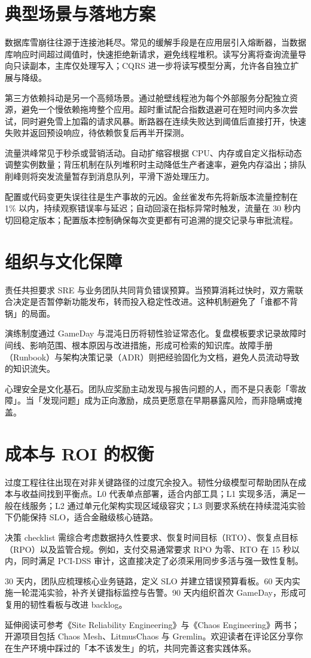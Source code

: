 \chapter{典型场景与落地方案}
数据库雪崩往往源于连接池耗尽。常见的缓解手段是在应用层引入熔断器，当数据库响应时间超过阈值时，快速拒绝新请求，避免线程堆积。读写分离将查询流量导向只读副本，主库仅处理写入；CQRS 进一步将读写模型分离，允许各自独立扩展与降级。\par
第三方依赖抖动是另一个高频场景。通过舱壁线程池为每个外部服务分配独立资源，避免一个慢依赖拖垮整个应用。超时重试配合指数退避可在短时间内多次尝试，同时避免雪上加霜的请求风暴。断路器在连续失败达到阈值后直接打开，快速失败并返回预设响应，待依赖恢复后再半开探测。\par
流量洪峰常见于秒杀或营销活动。自动扩缩容根据 CPU、内存或自定义指标动态调整实例数量；背压机制在队列堆积时主动降低生产者速率，避免内存溢出；排队削峰则将突发流量暂存到消息队列，平滑下游处理压力。\par
配置或代码变更失误往往是生产事故的元凶。金丝雀发布先将新版本流量控制在 1\%{} 以内，持续观察错误率与延迟；自动回滚在指标异常时触发，流量在 30 秒内切回稳定版本；配置版本控制确保每次变更都有可追溯的提交记录与审批流程。\par
\chapter{组织与文化保障}
责任共担要求 SRE 与业务团队共同背负错误预算。当预算消耗过快时，双方需联合决定是否暂停新功能发布，转而投入稳定性改进。这种机制避免了「谁都不背锅」的局面。\par
演练制度通过 GameDay 与混沌日历将韧性验证常态化。复盘模板要求记录故障时间线、影响范围、根本原因与改进措施，形成可检索的知识库。故障手册（Runbook）与架构决策记录（ADR）则把经验固化为文档，避免人员流动导致的知识流失。\par
心理安全是文化基石。团队应奖励主动发现与报告问题的人，而不是只表彰「零故障」。当「发现问题」成为正向激励，成员更愿意在早期暴露风险，而非隐瞒或掩盖。\par
\chapter{成本与 ROI 的权衡}
过度工程往往出现在对非关键路径的过度冗余投入。韧性分级模型可帮助团队在成本与收益间找到平衡点。L0 代表单点部署，适合内部工具；L1 实现多活，满足一般在线服务；L2 通过单元化架构实现区域级容灾；L3 则要求系统在持续混沌实验下仍能保持 SLO，适合金融级核心链路。\par
决策 checklist 需综合考虑数据持久性要求、恢复时间目标（RTO）、恢复点目标（RPO）以及监管合规。例如，支付交易通常要求 RPO 为零、RTO 在 15 秒以内，同时满足 PCI-DSS 审计，这直接决定了必须采用同步多活与强一致性复制。\par
30 天内，团队应梳理核心业务链路，定义 SLO 并建立错误预算看板。60 天内实施一轮混沌实验，补齐关键指标监控与告警。90 天内组织首次 GameDay，形成可复用的韧性看板与改进 backlog。\par
延伸阅读可参考《Site Reliability Engineering》与《Chaos Engineering》两书；开源项目包括 Chaos Mesh、LitmusChaos 与 Gremlin。欢迎读者在评论区分享你在生产环境中踩过的「本不该发生」的坑，共同完善这套实践体系。\par

